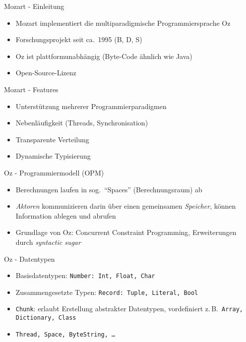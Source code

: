 \begin{frame}{Mozart - Einleitung}
  \begin{itemize}
    \item Mozart implementiert die multiparadigmische Programmiersprache Oz
    \item Forschungsprojekt seit ca.\ 1995 (B, D, S)
    \item Oz ist plattformunabhängig (Byte-Code ähnlich wie Java)
    \item Open-Source-Lizenz
  \end{itemize}
\end{frame}

\begin{frame}{Mozart - Features}
  \begin{itemize}
    \item Unterstützung mehrerer Programmierparadigmen
    \item Nebenläufigkeit (Threads, Synchronisation)
    \item Transparente Verteilung
    \item Dynamische Typisierung
  \end{itemize}
\end{frame}

\begin{frame}{Oz - Programmiermodell (OPM)}
  \begin{itemize}
    \item Berechnungen laufen in sog.\ "`Spaces"' (Berechnungsraum) ab
    \item \textsl{Aktoren} kommunizieren darin über einen gemeinsamen 
    \textsl{Speicher}, können Information ablegen und abrufen
    \item Grundlage von Oz: Concurrent Constraint Programming, Erweiterungen 
    durch \textsl{syntactic sugar}
  \end{itemize}
\end{frame}

\begin{frame}{Oz - Datentypen}
  \begin{itemize}
    \item Basisdatentypen: \texttt{Number: Int, Float, Char}
    \item Zusammengesetzte Typen: \texttt{Record: Tuple, Literal, Bool}
    \item \texttt{Chunk}: erlaubt Erstellung abstrakter Datentypen, vordefiniert
    z.\,B.\ \texttt{Array, Dictionary, Class}
    \item \texttt{Thread, Space, ByteString, \ldots}
  \end{itemize}
\end{frame}